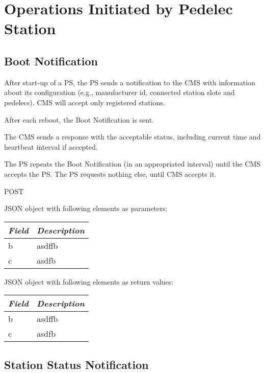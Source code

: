 \section{Operations Initiated by Pedelec Station}

\subsection{Boot Notification}

After start-up of a \acs{PS}, the \acs{PS} sends a notification to the \acs{CMS} with information about its configuration (e.g., manufacturer id, connected station slots and pedelecs). \acs{CMS} will accept only registered stations. 

After each reboot, the Boot Notification is sent.

The \acs{CMS} sends a response with the acceptable status, including current time and heartbeat interval if accepted.

The \acs{PS} repeats the Boot Notification (in an appropriated interval) until the \acs{CMS} accepts the \acs{PS}. The \acs{PS} requests nothing else, until \acs{CMS} accepts it.



 POST

JSON object with following elements as parameters:\\
\begin{tabularx}{\linewidth}{ l X }
  \hline
  \textit{Field} & \textit{Description} \\
  \hline \hline
  b 		& asdffb \\
  c 		& asdfb \\
\end{tabularx}

JSON object with following elements as return values:\\
\begin{tabularx}{\linewidth}{ l X }
  \hline
  \textit{Field} & \textit{Description} \\
  \hline \hline
  b 		& asdffb \\
  c 		& asdfb \\
\end{tabularx}


\subsection{Station Status Notification}

